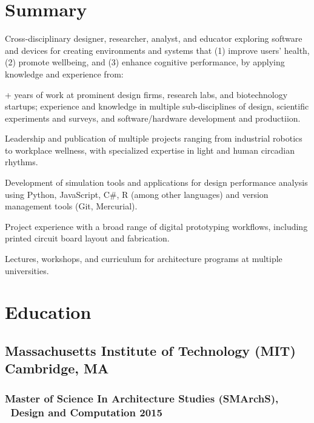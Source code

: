\documentclass[letterpaper, oneside, 10pt]{article}
\begin{document}
\StartCV%

\section*{Summary} %

Cross-disciplinary designer, researcher, analyst, and educator exploring
software and devices for creating environments and systems that (1) improve
users’ health, (2) promote wellbeing, and (3) enhance cognitive performance, by
applying knowledge and experience from:

\DotSep{0.25em} + years of work at
prominent design firms, research labs, and biotechnology
startups; experience and knowledge in multiple sub-disciplines of design,
scientific experiments and surveys, and software/hardware development and
productiion.

\DotSep{0.25em} Leadership and publication of multiple
projects ranging from industrial robotics to workplace wellness, with
specialized expertise in light and human circadian rhythms.

\DotSep{0.25em} Development of simulation tools and
applications for design performance analysis using Python, JavaScript,
C\#, R (among other languages) and version management tools (Git,
Mercurial).

\DotSep{0.25em} Project experience with a broad
range of digital prototyping workflows, including printed circuit board
 layout and fabrication.

\DotSep{0.25em} Lectures, workshops, and
curriculum for architecture programs at multiple universities.



\section*{Education} %
\AdjSectSpace

\subsection*{%
  Massachusetts Institute of Technology (MIT)%
  \DotSep{0.25em} Cambridge, MA%
}
  \subsubsection*{%
    Master of Science In Architecture Studies (SMArchS),%
    \ Design and Computation\DotSep{0.25em} 2015%
  }
    \\%
\end{document}
